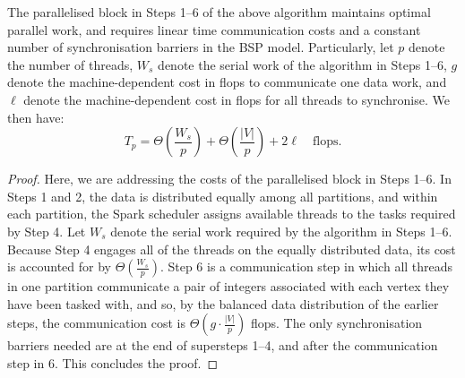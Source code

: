 \begin{proposition}
The parallelised block in Steps 1--6 of the above algorithm maintains optimal parallel work, and requires linear time communication costs and a constant number of synchronisation barriers in the BSP model. Particularly, let $p$ denote the number of threads, $W_s$ denote the serial work of the algorithm in Steps 1--6, $g$ denote the machine-dependent cost in flops to communicate one data work, and $\ell$ denote the machine-dependent cost in flops for all threads to synchronise. We then have:
\[
T_p = \Theta\left(\frac{W_s}{p}\right) + \Theta \left(\frac{\left \vert V \right \vert}{p}\right) + 2 \ell \quad \mbox{flops.} 
\]
\end{proposition}
\begin{proof}
Here, we are addressing the costs of the parallelised block in Steps 1--6. In Steps 1 and 2, the data is distributed equally among all partitions, and within each partition, the Spark scheduler assigns available threads to the tasks required by Step 4. Let $W_s$ denote the serial work required by the algorithm in Steps 1--6. Because Step 4 engages all of the threads on the equally distributed data, its cost is accounted for by $\Theta\left(\frac{W_s}{p}\right)$. 
%
%
Step 6 is a communication step in which all threads in one partition communicate a pair of integers associated with each vertex they have been tasked with, and so, by the balanced data distribution of the earlier steps, the communication cost is $\Theta \left (g \cdot \frac{\left \vert V \right \vert}{p} \right)$ flops. The only synchronisation barriers needed are at the end of supersteps 1--4, and after the communication step in 6. This concludes the proof.
\end{proof}

